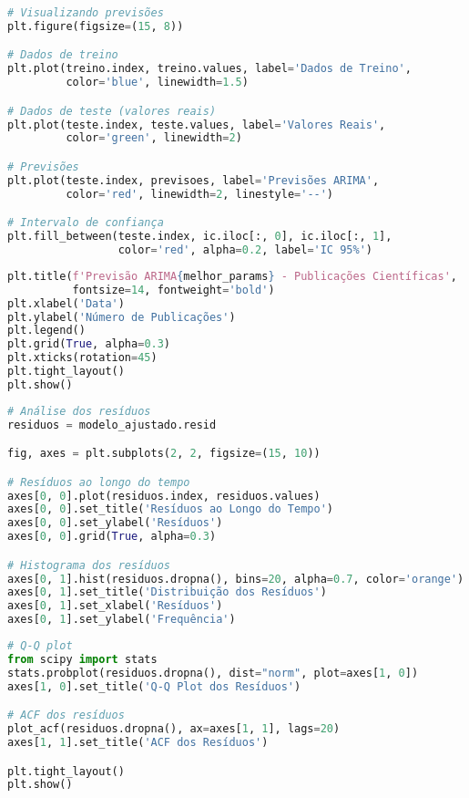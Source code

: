 \begin{pythonbox}
\begin{lstlisting}[language=Python]
# Visualizando previsões
plt.figure(figsize=(15, 8))

# Dados de treino
plt.plot(treino.index, treino.values, label='Dados de Treino', 
         color='blue', linewidth=1.5)

# Dados de teste (valores reais)
plt.plot(teste.index, teste.values, label='Valores Reais', 
         color='green', linewidth=2)

# Previsões
plt.plot(teste.index, previsoes, label='Previsões ARIMA', 
         color='red', linewidth=2, linestyle='--')

# Intervalo de confiança
plt.fill_between(teste.index, ic.iloc[:, 0], ic.iloc[:, 1], 
                 color='red', alpha=0.2, label='IC 95%')
\end{lstlisting}
\end{pythonbox}

\begin{pythonbox}
\begin{lstlisting}[language=Python]
plt.title(f'Previsão ARIMA{melhor_params} - Publicações Científicas', 
          fontsize=14, fontweight='bold')
plt.xlabel('Data')
plt.ylabel('Número de Publicações')
plt.legend()
plt.grid(True, alpha=0.3)
plt.xticks(rotation=45)
plt.tight_layout()
plt.show()
\end{lstlisting}
\end{pythonbox}

\begin{pythonbox}
\begin{lstlisting}[language=Python]
# Análise dos resíduos
residuos = modelo_ajustado.resid

fig, axes = plt.subplots(2, 2, figsize=(15, 10))

# Resíduos ao longo do tempo
axes[0, 0].plot(residuos.index, residuos.values)
axes[0, 0].set_title('Resíduos ao Longo do Tempo')
axes[0, 0].set_ylabel('Resíduos')
axes[0, 0].grid(True, alpha=0.3)

# Histograma dos resíduos
axes[0, 1].hist(residuos.dropna(), bins=20, alpha=0.7, color='orange')
axes[0, 1].set_title('Distribuição dos Resíduos')
axes[0, 1].set_xlabel('Resíduos')
axes[0, 1].set_ylabel('Frequência')
\end{lstlisting}
\end{pythonbox}

\begin{pythonbox}
\begin{lstlisting}[language=Python]
# Q-Q plot
from scipy import stats
stats.probplot(residuos.dropna(), dist="norm", plot=axes[1, 0])
axes[1, 0].set_title('Q-Q Plot dos Resíduos')

# ACF dos resíduos
plot_acf(residuos.dropna(), ax=axes[1, 1], lags=20)
axes[1, 1].set_title('ACF dos Resíduos')

plt.tight_layout()
plt.show()
\end{lstlisting}
\end{pythonbox}

